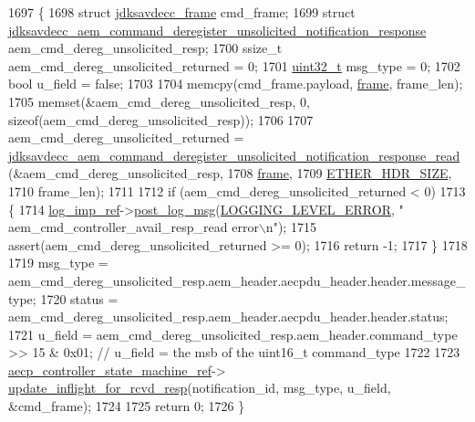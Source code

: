 \begin{DoxyCode}
1697 \{
1698     \textcolor{keyword}{struct }\hyperlink{structjdksavdecc__frame}{jdksavdecc\_frame} cmd\_frame;
1699     \textcolor{keyword}{struct }\hyperlink{structjdksavdecc__aem__command__deregister__unsolicited__notification__response}{jdksavdecc\_aem\_command\_deregister\_unsolicited\_notification\_response}
       aem\_cmd\_dereg\_unsolicited\_resp;
1700     ssize\_t aem\_cmd\_dereg\_unsolicited\_returned = 0;
1701     \hyperlink{parse_8c_a6eb1e68cc391dd753bc8ce896dbb8315}{uint32\_t} msg\_type = 0;
1702     \textcolor{keywordtype}{bool} u\_field = \textcolor{keyword}{false};
1703 
1704     memcpy(cmd\_frame.payload, \hyperlink{gst__avb__playbin_8c_ac8e710e0b5e994c0545d75d69868c6f0}{frame}, frame\_len);
1705     memset(&aem\_cmd\_dereg\_unsolicited\_resp, 0, \textcolor{keyword}{sizeof}(aem\_cmd\_dereg\_unsolicited\_resp));
1706 
1707     aem\_cmd\_dereg\_unsolicited\_returned = 
      \hyperlink{group__command__deregister__unsolicited__notification__response_gae9710f948e0509eb46a644040bd1d703}{jdksavdecc\_aem\_command\_deregister\_unsolicited\_notification\_response\_read}
      (&aem\_cmd\_dereg\_unsolicited\_resp,
1708                                                                                                            
             \hyperlink{gst__avb__playbin_8c_ac8e710e0b5e994c0545d75d69868c6f0}{frame},
1709                                                                                                            
             \hyperlink{namespaceavdecc__lib_a6c827b1a0d973e18119c5e3da518e65ca9512ad9b34302ba7048d88197e0a2dc0}{ETHER\_HDR\_SIZE},
1710                                                                                                            
             frame\_len);
1711 
1712     \textcolor{keywordflow}{if} (aem\_cmd\_dereg\_unsolicited\_returned < 0)
1713     \{
1714         \hyperlink{namespaceavdecc__lib_acbe3e2a96ae6524943ca532c87a28529}{log\_imp\_ref}->\hyperlink{classavdecc__lib_1_1log_a68139a6297697e4ccebf36ccfd02e44a}{post\_log\_msg}(\hyperlink{namespaceavdecc__lib_a501055c431e6872ef46f252ad13f85cdaf2c4481208273451a6f5c7bb9770ec8a}{LOGGING\_LEVEL\_ERROR}, \textcolor{stringliteral}{"
      aem\_cmd\_controller\_avail\_resp\_read error\(\backslash\)n"});
1715         assert(aem\_cmd\_dereg\_unsolicited\_returned >= 0);
1716         \textcolor{keywordflow}{return} -1;
1717     \}
1718 
1719     msg\_type = aem\_cmd\_dereg\_unsolicited\_resp.aem\_header.aecpdu\_header.header.message\_type;
1720     status = aem\_cmd\_dereg\_unsolicited\_resp.aem\_header.aecpdu\_header.header.status;
1721     u\_field = aem\_cmd\_dereg\_unsolicited\_resp.aem\_header.command\_type >> 15 & 0x01; \textcolor{comment}{// u\_field = the msb of
       the uint16\_t command\_type}
1722 
1723     \hyperlink{namespaceavdecc__lib_a0b1b5aea3c0490f77cbfd9178af5be22}{aecp\_controller\_state\_machine\_ref}->
      \hyperlink{classavdecc__lib_1_1aecp__controller__state__machine_a997abd9786c330a5505e903e6443208e}{update\_inflight\_for\_rcvd\_resp}(notification\_id, msg\_type, u\_field, &cmd\_frame);
1724 
1725     \textcolor{keywordflow}{return} 0;
1726 \}
\end{DoxyCode}


